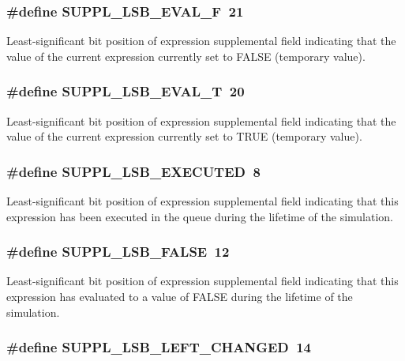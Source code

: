 \subsubsection{\setlength{\rightskip}{0pt plus 5cm}\#define SUPPL\_\-LSB\_\-EVAL\_\-F\ 21}\label{group__expr__suppl_a16}


Least-significant bit position of expression supplemental field indicating that the value of the current expression currently set to FALSE (temporary value). 
\subsubsection{\setlength{\rightskip}{0pt plus 5cm}\#define SUPPL\_\-LSB\_\-EVAL\_\-T\ 20}\label{group__expr__suppl_a15}


Least-significant bit position of expression supplemental field indicating that the value of the current expression currently set to TRUE (temporary value). 
\subsubsection{\setlength{\rightskip}{0pt plus 5cm}\#define SUPPL\_\-LSB\_\-EXECUTED\ 8}\label{group__expr__suppl_a3}


Least-significant bit position of expression supplemental field indicating that this expression has been executed in the queue during the lifetime of the simulation. 
\subsubsection{\setlength{\rightskip}{0pt plus 5cm}\#define SUPPL\_\-LSB\_\-FALSE\ 12}\label{group__expr__suppl_a7}


Least-significant bit position of expression supplemental field indicating that this expression has evaluated to a value of FALSE during the lifetime of the simulation. 
\subsubsection{\setlength{\rightskip}{0pt plus 5cm}\#define SUPPL\_\-LSB\_\-LEFT\_\-CHANGED\ 14}\label{group__expr__suppl_a9}



